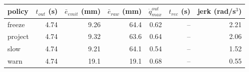 \begin{tabular}{lrrrrrr}
\toprule
policy & $t_{out}$ (s) & $\bar{e}_{emit}$ (mm) & $\bar{e}_{raw}$ (mm) & $\dot{q}_{max}^{out}$ & $t_{rec}$ (s) & jerk (rad/s$^3$) \\
\midrule
freeze & 4.74 & 9.26 & 64.4 & 0.62 & -- & 2.21 \\
project & 4.74 & 9.32 & 63.6 & 0.64 & -- & 2.06 \\
slow & 4.74 & 9.21 & 64.1 & 0.54 & -- & 1.52 \\
warn & 4.74 & 19.1 & 19.1 & 0.68 & -- & 0.55 \\
\bottomrule
\end{tabular}
